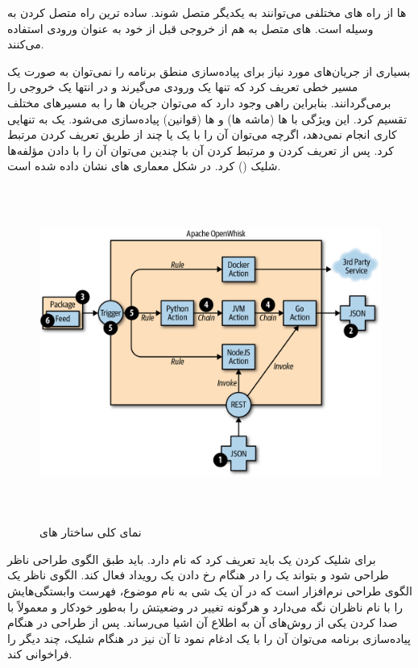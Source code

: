  ها از راه های مختلفی می‌توانند به یکدیگر متصل شوند. ساده ترین راه متصل کردن به وسیله  است.  های متصل به هم از خروجی  قبل از خود به عنوان ورودی استفاده می‌کنند.

بسیاری از جریان‌های مورد نیاز برای پیاده‌سازی منطق برنامه را نمی‌توان به صورت یک مسیر خطی تعریف کرد که تنها یک ورودی می‌گیرند و در انتها یک خروجی را برمی‌گردانند. بنابراین راهی وجود دارد که می‌توان جریان  ها را به مسیرهای مختلف تقسیم کرد. این ویژگی با  ها (ماشه ها) و  ها (قوانین) پیاده‌سازی می‌شود. یک  به تنهایی کاری انجام نمی‌دهد، اگرچه می‌توان آن را با یک یا چند  از طریق تعریف کردن  مرتبط کرد. پس از تعریف کردن  و مرتبط کردن آن با چندین  می‌توان آن را با دادن مؤلفه‌ها شلیک () کرد. در شکل معماری  های  نشان داده شده است.

\begin{figure}[!h]
	\centering
	\includegraphics[height=11cm]{images/OpenWhisk_actions_architecture}
	\caption{نمای کلی ساختار  های }
	\label{تصویر 2-1}
\end{figure}

برای شلیک کردن  یک  باید تعریف کرد که  نام دارد.  باید طبق الگوی طراحی ناظر طراحی شود و بتواند یک  را در هنگام رخ دادن یک رویداد فعال کند. الگوی ناظر یک الگوی طراحی نرم‌افزار است که در آن یک شی به نام موضوع، فهرست وابستگی‌هایش را با نام ناظران نگه می‌دارد و هرگونه تغییر در وضعیتش را به‌طور خودکار و معمولاً با صدا کردن یکی از روش‌های آن به اطلاع آن اشیا می‌رساند. پس از طراحی  در هنگام پیاده‌سازی برنامه می‌توان آن را با یک  ادغام نمود تا آن  نیز در هنگام شلیک، چند  دیگر را فراخوانی کند.

